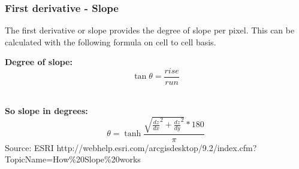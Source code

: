 \subsubsection{First derivative - Slope}
The first derivative or slope provides the degree of slope per pixel. This can be calculated with the following formula on cell to cell basis. 

\textbf{Degree of slope:}
\begin{equation}
\tan \theta = \frac{rise}{run}
\end{equation}
~\cite{ahnformula}

\textbf{So slope in degrees:}
\begin{equation}
\theta = \tanh \frac{\sqrt{\frac{dz}{dx}^2 + \frac{dz}{dy}^2 }*180 }{\pi}
\end{equation}
Source: ESRI 
http://webhelp.esri.com/arcgisdesktop/9.2/index.cfm?TopicName=How\%20Slope\%20works~\cite{ahnformula}





